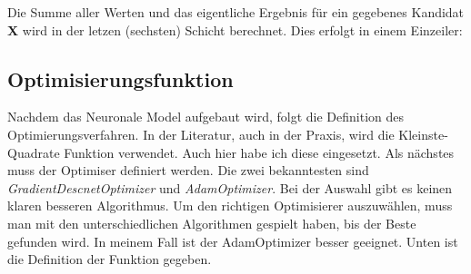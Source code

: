Die Summe aller Werten und das eigentliche Ergebnis für ein gegebenes
Kandidat \textbf{X} wird in der letzen (sechsten) Schicht berechnet.
Dies erfolgt in einem Einzeiler:


    \hypertarget{optimisierungsfunktion}{%
\subsection{Optimisierungsfunktion}\label{optimisierungsfunktion}}

Nachdem das Neuronale Model aufgebaut wird, folgt die Definition des
Optimierungsverfahren. In der Literatur, auch in der Praxis, wird die
Kleinste-Quadrate Funktion verwendet. Auch hier habe ich diese
eingesetzt. Als nächstes muss der Optimiser definiert werden. Die zwei
bekanntesten sind \emph{GradientDescnetOptimizer} und
\emph{AdamOptimizer}. Bei der Auswahl gibt es keinen klaren besseren
Algorithmus. Um den richtigen Optimisierer auszuwählen, muss man mit den
unterschiedlichen Algorithmen gespielt haben, bis der Beste gefunden
wird. In meinem Fall ist der AdamOptimizer besser geeignet. Unten ist
die Definition der Funktion gegeben.

%        

